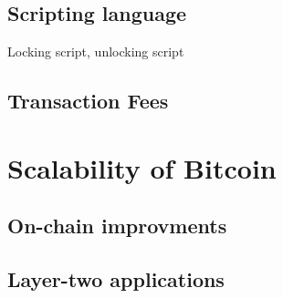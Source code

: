 \lipsum[1-2]

\subsection{Scripting language}
Locking script, unlocking script
\subsection{Transaction Fees}

\section{Scalability of Bitcoin}

\lipsum[1-2]

\subsection{On-chain improvments}
\subsection{Layer-two applications}
